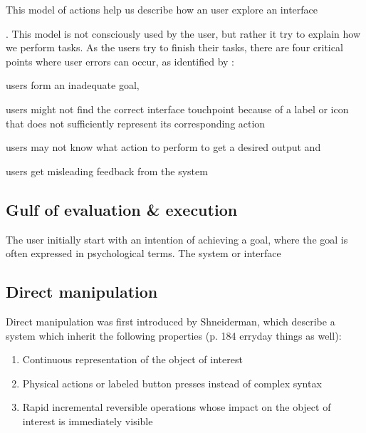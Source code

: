 \begin{enumerate}
This model of actions help us describe how an user explore an interface . This model is not consciously used by the user, but rather it try to explain how we perform tasks. As the users try to finish their tasks, there are four critical points where user errors can occur, as identified by \cite{Shneiderman2004}:
\begin{enumerate*}
  \item users form an inadequate goal,
  \item users might not find the correct interface touchpoint because of a label or icon that does not sufficiently represent its corresponding action
  \item users may not know what action to perform to get a desired output and
  \item users get misleading feedback from the system
\end{enumerate*}



\subsection{Gulf of evaluation \& execution}
The user initially start with an intention of achieving a goal, where the goal is often expressed in psychological terms. The system or interface

\subsection{Direct manipulation}

Direct manipulation was first introduced by Shneiderman, which describe a system which inherit the following properties (p. 184 erryday things as well):

\begin{enumerate}
  \item Continuous representation of the object of interest
  \item Physical actions or labeled button presses instead of complex syntax
  \item Rapid incremental reversible operations whose impact on the object of interest is immediately visible
\end{enumerate}


\end{enumerate}
